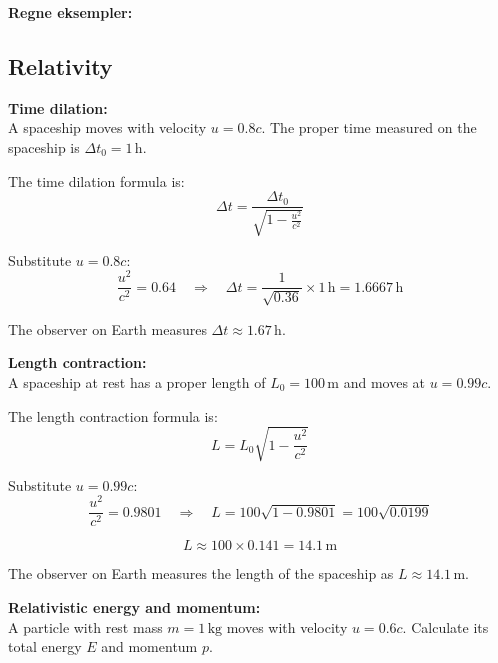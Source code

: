 \documentclass{article}
\begin{document}
\begin{center}
    \Large\textbf{Regne eksempler:} \\[0.8cm] %
\end{center}
\begin{multicols}{2}
\section*{Relativity}


\begin{minipage}{\linewidth}
\textbf{Time dilation:} \\[-0.2cm]

A spaceship moves with velocity \( u = 0.8c \). The proper time measured on the spaceship is \( \Delta t_0 = 1 \, \si{\hour} \).

The time dilation formula is:
\[
\Delta t = \frac{\Delta t_0}{\sqrt{1 - \frac{u^2}{c^2}}}
\]

Substitute \( u = 0.8c \):
\[
\frac{u^2}{c^2} = 0.64 \quad \Rightarrow \quad \Delta t = \frac{1}{\sqrt{0.36}} \times 1 \, \si{\hour} = 1.6667 \, \si{\hour}
\]

The observer on Earth measures \( \Delta t \approx 1.67 \, \si{\hour} \).

\vspace{0.5cm}
\end{minipage}

\begin{minipage}{\linewidth}
\textbf{Length contraction:} \\[-0.2cm]

A spaceship at rest has a proper length of \( L_0 = 100 \, \si{\meter} \) and moves at \( u = 0.99c \).

The length contraction formula is:
\[
L = L_0 \sqrt{1 - \frac{u^2}{c^2}}
\]

Substitute \( u = 0.99c \):
\[
\frac{u^2}{c^2} = 0.9801 \quad \Rightarrow \quad L = 100 \sqrt{1 - 0.9801} = 100 \sqrt{0.0199}
\]

\[
L \approx 100 \times 0.141 = 14.1 \, \si{\meter}
\]

The observer on Earth measures the length of the spaceship as \( L \approx 14.1 \, \si{\meter} \).
\end{minipage}

\begin{minipage}{\linewidth}
\textbf{Relativistic energy and momentum:} \\[-0.2cm]

A particle with rest mass \( m = 1 \, \si{\kilogram} \) moves with velocity \( u = 0.6c \). Calculate its total energy \( E \) and momentum \( p \).


\end{minipage}
\end{multicols}
\end{document}
